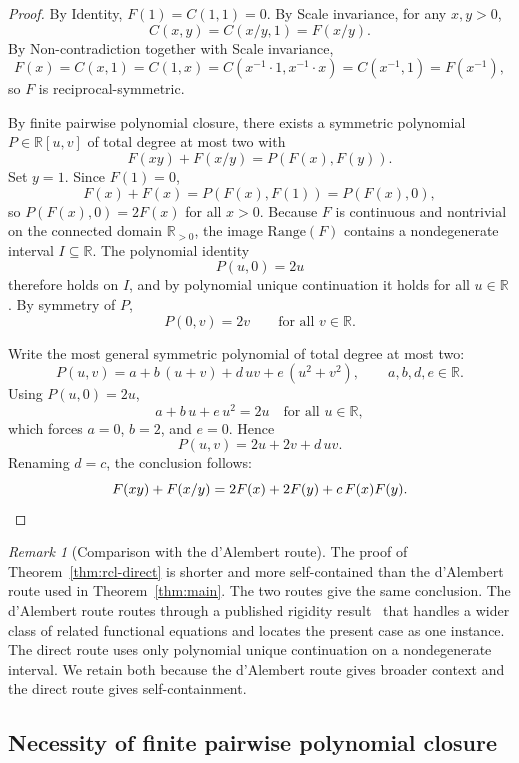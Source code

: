 \documentclass[11pt,a4paper]{article}
\theoremstyle{definition}
\theoremstyle{remark}
\newtheorem{remark}[theorem]{Remark}
\begin{document}
\begin{proof}
By Identity, $F(1) = C(1, 1) = 0$. By Scale invariance, for any
$x, y > 0$,
\[
C(x, y) = C(x/y, 1) = F(x/y).
\]
By Non-contradiction together with Scale invariance,
\[
F(x) = C(x, 1) = C(1, x) = C(x^{-1} \cdot 1, x^{-1} \cdot x) = C(x^{-1}, 1) = F(x^{-1}),
\]
so $F$ is reciprocal-symmetric.

By finite pairwise polynomial closure, there exists a symmetric polynomial
$P \in \mathbb{R}[u, v]$ of total degree at most two with
\[
F(xy) + F(x/y) = P(F(x), F(y)).
\]
Set $y = 1$. Since $F(1) = 0$,
\[
F(x) + F(x) = P(F(x), F(1)) = P(F(x), 0),
\]
so $P(F(x), 0) = 2 F(x)$ for all $x > 0$. Because $F$ is continuous and
nontrivial on the connected domain $\mathbb{R}_{>0}$, the image
$\mathrm{Range}(F)$ contains a nondegenerate interval $I \subseteq
\mathbb{R}$. The polynomial identity
\[
P(u, 0) = 2u
\]
therefore holds on $I$, and by polynomial unique continuation it holds
for all $u \in \mathbb{R}$. By symmetry of $P$,
\[
P(0, v) = 2v \qquad \text{for all } v \in \mathbb{R}.
\]

Write the most general symmetric polynomial of total degree at most two:
\[
P(u, v) = a + b\,(u + v) + d \, uv + e\,(u^2 + v^2),
\qquad a, b, d, e \in \mathbb{R}.
\]
Using $P(u, 0) = 2u$,
\[
a + b\,u + e\,u^2 = 2u
\quad \text{for all } u \in \mathbb{R},
\]
which forces $a = 0$, $b = 2$, and $e = 0$. Hence
\[
P(u, v) = 2u + 2v + d \, uv.
\]
Renaming $d = c$, the conclusion follows:
\[
F(xy) + F(x/y) = 2 F(x) + 2 F(y) + c\,F(x) F(y).
\qedhere
\]
\end{proof}

\begin{remark}[Comparison with the d'Alembert route]
\label{rem:direct-vs-dAlembert}
The proof of Theorem~\ref{thm:rcl-direct} is shorter and more
self-contained than the d'Alembert route used in
Theorem~\ref{thm:main}. The two routes give the same conclusion. The
d'Alembert route routes through a published rigidity
result~\cite{WashburnZlatanovicAllahyarov2026} that handles a wider
class of related functional equations and locates the present case as
one instance. The direct route uses only polynomial unique continuation
on a nondegenerate interval. We retain both because the d'Alembert
route gives broader context and the direct route gives self-containment.
\end{remark}

\subsection{Necessity of finite pairwise polynomial closure}
\end{document}
